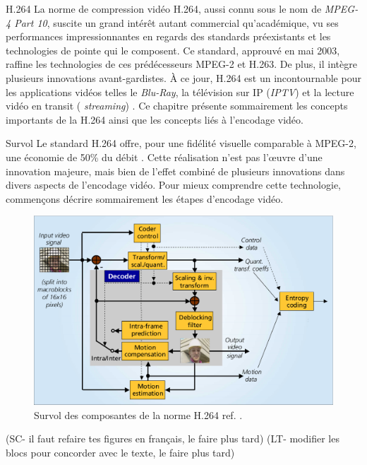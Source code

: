 \documentclass{article}
\begin{document}
\begin{section}{H.264}
La norme de compression vidéo H.264, aussi connu sous le nom de \textit{MPEG-4 
Part 10}, suscite un grand intérêt autant commercial qu'académique, vu ses
performances impressionnantes en regards des standards préexistants et les
technologies de pointe qui le composent. Ce standard, approuvé en mai 2003,
raffine les technologies de ces prédécesseurs MPEG-2 et H.263. De plus, il
intègre plusieurs innovations avant-gardistes. À ce jour, H.264 est un
incontournable pour les applications vidéos telles le \textit{Blu-Ray},
la télévision sur IP (\textit{IPTV}) et la lecture vidéo en transit ( \textit{streaming})
. Ce chapitre présente sommairement les concepts importants de la 
H.264 ainsi que les concepts liés à l'encodage vidéo.

\begin{subsection}{Survol}
Le standard H.264 offre, pour une fidélité visuelle comparable à MPEG-2, une économie 
de 50\% du débit \cite{sullivan2005}. Cette réalisation n'est pas l'œuvre d'une
innovation majeure, mais bien de l'effet combiné de plusieurs innovations dans
divers aspects de l'encodage vidéo. Pour mieux comprendre cette technologie,
commençons décrire sommairement les étapes d'encodage vidéo.

\begin{figure}[htb]
\centering
\includegraphics[width=\linewidth]{images/encoderOverview.png}
\caption{Survol des composantes de la norme H.264 ref. \cite{schafer2003}.}
\label{fig-EncoderOverview}
\end{figure}
(SC- il faut refaire tes figures en français, le faire plus tard)
(LT- modifier les blocs pour concorder avec le texte, le faire plus tard)


\end{subsection}
\end{section}
\end{document}
